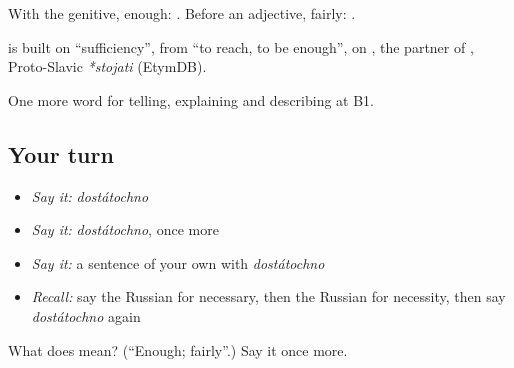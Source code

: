 With the genitive, enough: \emph{ }. Before an adjective, fairly: \emph{ }.

\begin{cousinweb}
\textbf{} is built on \emph{} \textquotedblleft{}sufficiency\textquotedblright{}, from \emph{} \textquotedblleft{}to reach, to be enough\textquotedblright{}, on \emph{}, the partner of \emph{}, Proto-Slavic \emph{*stojati} (EtymDB).
\end{cousinweb}

\begin{grammarlens}[title={What you've built}]
One more word for telling, explaining and describing at B1.
\end{grammarlens}

\subsection*{Your turn}
\begin{itemize}
\raggedright
  \item \emph{Say it:} \emph{dostátochno}
  \item \emph{Say it:} \emph{dostátochno}, once more
  \item \emph{Say it:} a sentence of your own with \emph{dostátochno}
  \item \emph{Recall:} say the Russian for necessary, then the Russian for necessity, then say \emph{dostátochno} again
\end{itemize}

\begin{tcolorbox}[breakable,colback=teal!4,colframe=teal!35!black,title={Before you move on}]
What does  mean? (\textquotedblleft{}Enough; fairly\textquotedblright{}.) Say it once more.
\end{tcolorbox}
